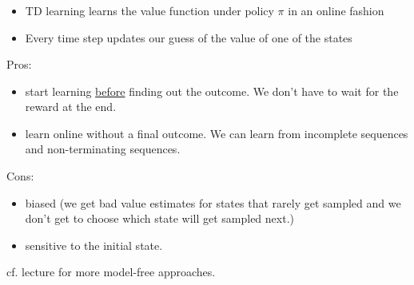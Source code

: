 \begin{frame}\frametitle{\subsubsecname}

\begin{itemize}
\item TD learning learns the value function under policy $\pi$ in an online fashion
\item Every time step updates our guess of the value of one of the states
\end{itemize}

\vspace{10mm}

Pros:
\begin{itemize}
	\item start learning \underline{before} finding out the outcome. We don't have to wait for the reward at the end.
	\item learn online without a final outcome. We can learn from incomplete sequences and non-terminating sequences.
\end{itemize}

Cons:
\pause
\begin{itemize}
	\item biased (we get bad value estimates for states that rarely get sampled and we don't get to choose which state will get sampled next.)
	\item sensitive to the initial state.
\end{itemize}

cf. lecture for more model-free approaches.%

\end{frame}

